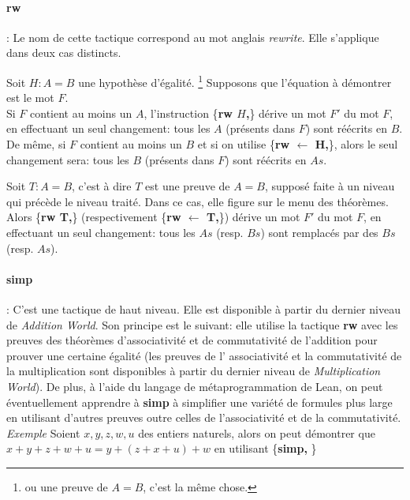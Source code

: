 \paragraph {\large\textbf{rw}}: Le nom de cette tactique correspond au mot anglais \textit{rewrite}. Elle s'applique dans deux cas distincts.

Soit $H : A = B$ une hypothèse d'égalité. \footnote{ou une preuve de $A = B$, c'est la même chose.}
Supposons que l'équation à démontrer est le mot $F$. \\Si $F$ contient au moins un $A$, l'instruction \big\{\textbf{rw $H$,}\big\} dérive un mot $F'$ du mot $F$, en effectuant un seul changement: tous les $A$ (présents dans $F$) sont réécrits en $B$. De même, si $F$ contient au moins un $B$ et si on utilise \big\{\textbf{rw $\leftarrow$ H,}\big\}, alors le seul changement sera: tous les $B$ (présents dans $F$) sont réécrits en $As$.

Soit $T: A=B$, c'est à dire $T$ est une preuve de $A=B$, supposé faite à un niveau qui précède le niveau traité. Dans ce cas, elle figure sur le menu des théorèmes. Alors \big\{\textbf{rw T,}\big\} (respectivement \big\{\textbf{rw $\leftarrow$ T,}\big\}) dérive un mot $F'$ du mot $F$, en effectuant un seul changement: tous les $As$ (resp. $Bs$) sont remplacés par des $Bs$ (resp. $As$). 
\paragraph {\large\textbf{simp}}: C'est une tactique de haut niveau. Elle est disponible à partir du dernier niveau de \textit{Addition World}. Son principe est le suivant: elle utilise la tactique \textbf{rw} avec les preuves des théorèmes d'associativité et de commutativité de l'addition pour prouver une certaine égalité (les preuves de l' associativité et la commutativité de la multiplication sont disponibles à partir du dernier niveau de \textit{Multiplication World}). De plus, à l'aide du langage de métaprogrammation de Lean, on peut éventuellement apprendre  à \textbf{simp} à simplifier une variété de formules plus large en utilisant d'autres preuves outre celles de l'associativité et de la commutativité.   \\
\textit{Exemple} Soient $x,y,z,w,u$ des entiers naturels, alors on peut démontrer que $x+y+z+w+u=y+(z+x+u)+w$ en utilisant \big\{\textbf{simp,} \big\}


